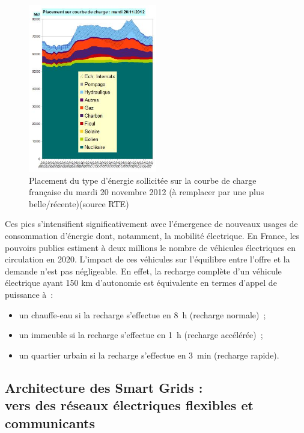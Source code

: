 \begin{figure}[!htbp]
 \begin{center}
  
\includegraphics[width=0.5\textwidth]{figures/1_problematique/ccharge.jpg}
 \end{center}
 \caption{Placement du type d'énergie sollicitée sur la courbe de charge 
française du mardi 20 novembre 2012 (à remplacer par une plus 
belle/récente)(source RTE)}
 \label{fig:courbeCharge}
\end{figure}

Ces pics s'intensifient significativement avec l'émergence de nouveaux usages de 
consommation d'énergie dont, notamment, la mobilité électrique. En France, les 
pouvoirs publics estiment à deux millions le nombre de véhicules électriques en 
circulation en 2020. L'impact de ces véhicules sur l'équilibre entre l'offre et 
la demande n'est pas négligeable. En effet, la recharge complète d'un véhicule 
électrique ayant 150 km d'autonomie est équivalente en termes d'appel de 
puissance à~:
\begin{itemize}[noitemsep]
    \item un chauffe-eau si la recharge s'effectue en 8~h (recharge normale)~;
    \item un immeuble si la recharge s'effectue en 1~h (recharge accélérée)~;
    \item un quartier urbain si la recharge s'effectue en 3~min (recharge rapide).
\end{itemize}



\subsection{Architecture des Smart Grids : \\
vers des réseaux électriques flexibles et communicants}


